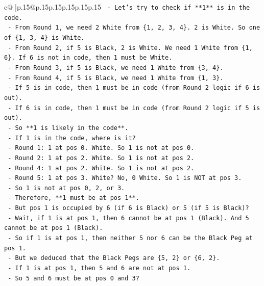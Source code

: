 \documentclass{article}
\begin{document}
{\begin{supertabular}{c@{$\;$}|p{.15\linewidth}@{}p{.15\linewidth}p{.15\linewidth}p{.15\linewidth}p{.15\linewidth}p{.15\linewidth}}
{{{\texttt{            {-} Let's try to check if **1** is in the code.} \\
\texttt{            {-} From Round 1, we need 2 White from \{1, 2, 3, 4\}. 2 is White. So one of \{1, 3, 4\} is White.} \\
\texttt{            {-} From Round 2, if 5 is Black, 2 is White. We need 1 White from \{1, 6\}. If 6 is not in code, then 1 must be White.} \\
\texttt{            {-} From Round 3, if 5 is Black, we need 1 White from \{3, 4\}.} \\
\texttt{            {-} From Round 4, if 5 is Black, we need 1 White from \{1, 3\}.} \\
\texttt{            {-} If 5 is in code, then 1 must be in code (from Round 2 logic if 6 is out).} \\
\texttt{            {-} If 6 is in code, then 1 must be in code (from Round 2 logic if 5 is out).} \\
\texttt{            {-} So **1 is likely in the code**.} \\
\texttt{            {-} If 1 is in the code, where is it?} \\
\texttt{                {-} Round 1: 1 at pos 0. White. So 1 is not at pos 0.} \\
\texttt{                {-} Round 2: 1 at pos 2. White. So 1 is not at pos 2.} \\
\texttt{                {-} Round 4: 1 at pos 2. White. So 1 is not at pos 2.} \\
\texttt{                {-} Round 5: 1 at pos 3. White? No, 0 White. So 1 is NOT at pos 3.} \\
\texttt{                {-} So 1 is not at pos 0, 2, or 3.} \\
\texttt{                {-} Therefore, **1 must be at pos 1**.} \\
\texttt{            {-} But pos 1 is occupied by 6 (if 6 is Black) or 5 (if 5 is Black)?} \\
\texttt{            {-} Wait, if 1 is at pos 1, then 6 cannot be at pos 1 (Black). And 5 cannot be at pos 1 (Black).} \\
\texttt{            {-} So if 1 is at pos 1, then neither 5 nor 6 can be the Black Peg at pos 1.} \\
\texttt{            {-} But we deduced that the Black Pegs are \{5, 2\} or \{6, 2\}.} \\
\texttt{            {-} If 1 is at pos 1, then 5 and 6 are not at pos 1.} \\
\texttt{            {-} So 5 and 6 must be at pos 0 and 3?} \\
}}}
\end{supertabular}}
\end{document}
